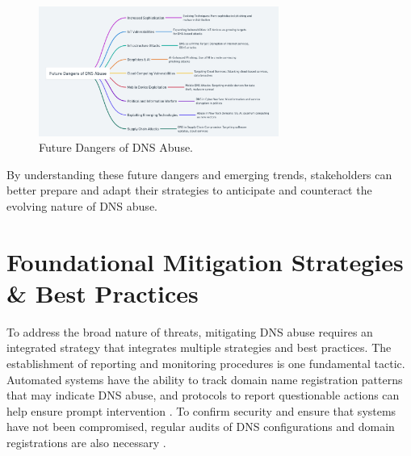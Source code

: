 \captionsetup{font= footnotesize} 
\begin{figure}  [H]
    \centering
    \includegraphics[width=0.7\textwidth]{background/Future Dangers of DNS Abuse.png}
    \caption{Future Dangers of DNS Abuse.}
    \label{fig:LOLOLOL}
\end{figure}

By understanding these future dangers and emerging trends, stakeholders can better prepare and adapt their strategies to anticipate and counteract the evolving nature of DNS abuse.


\section{Foundational Mitigation Strategies \& Best Practices }


To address the broad nature of threats, mitigating DNS abuse requires an integrated strategy that integrates multiple strategies and best practices. The establishment of reporting and monitoring procedures is one fundamental tactic. Automated systems have the ability to track domain name registration patterns that may indicate DNS abuse, and protocols to report questionable actions can help ensure prompt intervention \cite{icannndnssec}. To confirm security and ensure that systems have not been compromised, regular audits of DNS configurations and domain registrations are also necessary \cite{lucas2021tls} .

